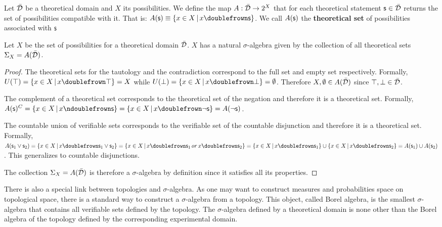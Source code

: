 \documentclass[11pt,letterpaper,fleqn]{memoir} %
\begin{document}
\begin{mathSection}
	
	\begin{defn}
		Let $\bar{\mathcal{D}}$ be a theoretical domain and $X$ its possibilities. We define the map $A : \bar{\mathcal{D}} \rightarrow 2^X$ that for each theoretical statement $\mathsf{s} \in \bar{\mathcal{D}}$ returns the set of possibilities compatible with it. That is: $A(\stmt)\equiv\{ x \in X \, | \, x \comp \stmt\}$. We call $A(\mathsf{s})$ the \textbf{theoretical set} of possibilities associated with $\mathsf{s}$
	\end{defn}
	
	\begin{prop}
		Let $X$ be the set of possibilities for a theoretical domain $\bar{\mathcal{D}}$. $X$ has a natural $\sigma$-algebra given by the collection of all theoretical sets $\Sigma_X=A(\bar{\mathcal{D}})$.
	\end{prop}
	
	\begin{proof}
	The theoretical sets for the tautology and the contradiction correspond to the full set and empty set respectively. Formally, $U(\tautology) = \{ x \in X \, | \, x \comp \tautology\} = X$ while $U(\contradiction) = \{ x \in X \, | \, x \comp \contradiction\} = \emptyset$. Therefore $X, \emptyset \in A(\bar{\mathcal{D}})$ since $\top, \bot \in \bar{\mathcal{D}}$.

	The complement of a theoretical set corresponds to the theoretical set of the negation and therefore it is a theoretical set. Formally, $A(\stmt)^C = \{ x \in X \, | \, x \ncomp \stmt\} =  \{ x \in X \, | \, x \comp \NOT\stmt\} = A(\NOT\stmt)$.

	The countable union of verifiable sets corresponds to the verifiable set of the countable disjunction and therefore it is a theoretical set. Formally, $A(\stmt_1\OR\stmt_2) = \{ x \in X \, | \, x \comp \stmt_1\OR\stmt_2\} =  \{ x \in X \, | \, x \comp \stmt_1 \, or \, x \comp \stmt_2\} = \{ x \in X \, | \, x \comp \stmt_1\} \cup \{ x \in X \, | \, x \comp \stmt_2\} = A(\stmt_1) \cup A(\stmt_2)$. This generalizes to countable disjunctions.

	The collection $\Sigma_X=A(\bar{\mathcal{D}})$ is therefore a $\sigma$-algebra by definition since it satisfies all its properties.
	\end{proof}
\end{mathSection}

There is also a special link between topologies and $\sigma$-algebra. As one may want to construct measures and probabilities space on topological space, there is a standard way to construct a $\sigma$-algebra from a topology. This object, called Borel algebra, is the smallest $\sigma$-algebra that contains all verifiable sets defined by the topology. The $\sigma$-algebra defined by a theoretical domain is none other than the Borel algebra of the topology defined by the corresponding experimental domain.
\end{document}
